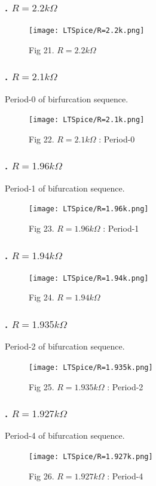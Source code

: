 \documentclass[12pt]{article}
\begin{document}
\subsubsection*{. $R=2.2k\Omega$}
\begin{figure}[H] %
	\centering
	\texttt{[image: LTSpice/R=2.2k.png]}
	\caption{Fig 21. $R=2.2k\Omega$}
\end{figure}
\subsubsection*{. $R=2.1k\Omega$}
Period-0 of birfurcation sequence.
\begin{figure}[H] %
	\centering 
	\texttt{[image: LTSpice/R=2.1k.png]}
	\caption{Fig 22. $R=2.1k\Omega$ : Period-0}
\end{figure}
\subsubsection*{. $R=1.96k\Omega$}
Period-1 of bifurcation sequence.
\begin{figure}[H] %
	\centering
	\texttt{[image: LTSpice/R=1.96k.png]}
	\caption{Fig 23. $R=1.96k\Omega$ : Period-1}
\end{figure}
\subsubsection*{. $R=1.94k\Omega$}
\begin{figure}[H] %
	\centering
	\texttt{[image: LTSpice/R=1.94k.png]}
	\caption{Fig 24. $R=1.94k\Omega$}
\end{figure}
\subsubsection*{. $R=1.935k\Omega$}
Period-2 of bifurcation sequence.
\begin{figure}[H] %
	\centering
	\texttt{[image: LTSpice/R=1.935k.png]}
	\caption{Fig 25. $R=1.935k\Omega$ : Period-2}
\end{figure}
\subsubsection*{. $R=1.927k\Omega$}
Period-4 of bifurcation sequence.
\begin{figure}[H] %
	\centering
	\texttt{[image: LTSpice/R=1.927k.png]}
	\caption{Fig 26. $R=1.927k\Omega$ : Period-4}
\end{figure}
\end{document}
